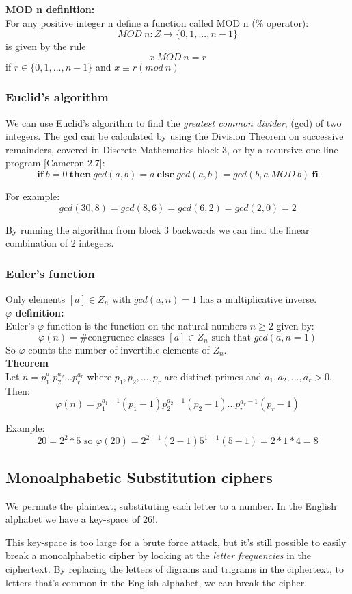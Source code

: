 \documentclass{article}
\begin{document}
	\textbf{MOD n definition: }\\
	For any positive integer n define a function called MOD n (\% operator):
	$$
	MOD \ n : Z \rightarrow \{0,1,...,n-1\}
	$$
	is given by the rule 
	$$
	x \ MOD \ n = r
	$$
	if $r \in \{0,1,...,n-1\}$ and $x \equiv r (mod \ n)$
	
	\subsubsection*{Euclid's algorithm}
	We can use Euclid's algorithm to find the \textit{greatest common divider}, (gcd) of two integers. The gcd can be calculated by using the Division Theorem on successive remainders, covered in Discrete Mathematics block 3, or by a recursive one-line program [Cameron 2.7]:
	$$
	\textbf{if} \ b = 0 \ \textbf{then} \ gcd(a,b)= a \ \textbf{else} \ gcd(a,b) = gcd(b,a \ MOD \ b) \ \textbf{fi}
	$$
	
	For example:
	$$
	gcd(30,8)=gcd(8,6)=gcd(6,2)=gcd(2,0)=2
	$$
	
	By running the algorithm from block 3 backwards we can find the linear combination of 2 integers. 
	
	\subsubsection*{Euler’s function}
	Only elements $[a] \in Z_n$ with $gcd(a,n) = 1$ has a multiplicative inverse. \\
	
	\textbf{$\varphi$ definition: }\\
	Euler's $\varphi$ function is the function on the natural numbers $n \geq 2$ given by:
	$$
	\varphi(n) =  \text{\# congruence classes } [a] \in Z_n \text{ such that }gcd(a,n = 1)
	$$
	So $\varphi$ counts the number of invertible elements of $Z_n$. \\
	
	\textbf{Theorem} \\
	Let $n = p_{1}^{a_1}p_{2}^{a_2}...p_{r}^{a_r}$ where $p_1,p_2,...,p_r$ are distinct primes and $a_1,a_2,...,a_r > 0$. Then:
	$$
	\varphi(n) = p_{1}^{a_1-1}(p_1-1)p_{2}^{a_2-1}(p_2-1)...p_{r}^{a_r-1}(p_r-1)
	$$
	
	Example:
	$$
	20 = 2^2*5 \text{ \ \ \ so \ \ } \varphi(20) = 2^{2-1}(2-1)5^{1-1}(5-1) = 2*1*4 = 8
	$$
	
	\subsection*{Monoalphabetic Substitution ciphers}
	We permute the plaintext, substituting each letter to a number. In the English alphabet we have a key-space of $26!$. 
	
	This key-space is too large for a brute force attack, but it's still possible to easily break a monoalphabetic cipher by looking at the \textit{letter frequencies} in the ciphertext. By replacing the letters of digrams and trigrams in the ciphertext, to letters that's common in the English alphabet, we can break the cipher. 

~
\end{document}
